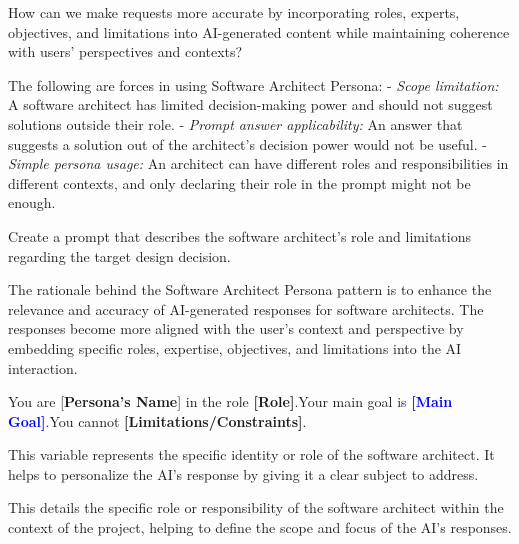  How can we make requests more accurate by incorporating roles, experts, objectives, and limitations into AI-generated content while maintaining coherence with users' perspectives and contexts?

 The following are forces in using Software Architect Persona:
\newline
- \textit{Scope limitation:} A software architect has limited decision-making power and should not suggest solutions outside their role.
\newline
- \textit{Prompt answer applicability:} An answer that suggests a solution out of the architect's decision power would not be useful.
\newline
- \textit{Simple persona usage:} An architect can have different roles and responsibilities in different contexts, and only declaring their role in the prompt might not be enough.

 Create a prompt that describes the software architect's role and limitations regarding the target design decision.

 The rationale behind the Software Architect Persona pattern is to enhance the relevance and accuracy of AI-generated responses for software architects. The responses become more aligned with the user's context and perspective by embedding specific roles, expertise, objectives, and limitations into the AI interaction.



You are \textcolor{mycolorgreen}{[\textbf{Persona's Name}]} in the role \textcolor{mycolorgreen}{\textbf{[Role]}}.Your main goal is \textcolor{blue}{\textbf{[Main Goal]}.}You cannot \textcolor{mycolorpink}{\textbf{[Limitations/Constraints]}}.

\MyParaBold{\textcolor{mycolorgreen}{-[Persona's Name]:}} This variable represents the specific identity or role of the software architect. It helps to personalize the AI’s response by giving it a clear subject to address.

\MyParaBold{\textcolor{mycolorgreen}{-[Role]:}} This details the specific role or responsibility of the software architect within the context of the project, helping to define the scope and focus of the AI’s responses.

